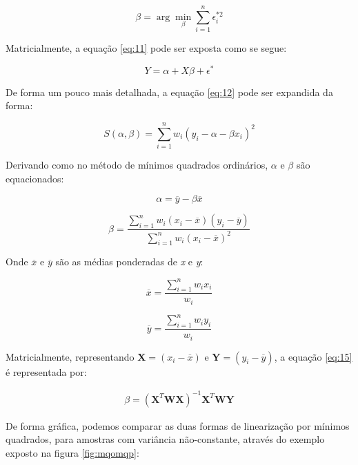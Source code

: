 \begin{equation}\label{eq:12}
 \beta =\arg\min_{\beta}\sum_{i=1}^{n}\epsilon_{i}^{*2}
\end{equation}

Matricialmente, a equação \ref{eq:11} pode ser exposta como se segue:

\begin{equation}\label{eq:11matrix}
Y = \alpha + X\beta +\epsilon^\ast
\end{equation}

De forma um pouco mais detalhada, a equação \ref{eq:12} pode ser expandida da forma:

\begin{equation}\label{eq:13}
 S(\alpha,\beta) =\sum_{i=1}^{n} w_i(y_i - \alpha - \beta x_i)^2 
\end{equation}

Derivando como no método de mínimos quadrados ordinários, $\alpha$ e $\beta$ são equacionados:

\begin{equation}\label{eq:14}
 \alpha = \overline{y} - \beta \overline{x} 
\end{equation}

\begin{equation}\label{eq:15}
  \beta =\frac{\sum_{i=1}^{n}w_i(x_i - \overline{x})(y_i - \overline{y})}{\sum_{i=1}^{n} w_i(x_i - \overline{x})^2} 
\end{equation}

Onde $\overline{x}$ e $\overline{y}$ são as médias ponderadas de \textit{x} e \textit{y}:

\begin{equation*}
  \overline{x} =\frac{\sum_{i=1}^{n}w_i x_i}{w_i} 
\end{equation*}

\begin{equation*}
  \overline{y} =\frac{\sum_{i=1}^{n}w_i y_i}{w_i} 
\end{equation*}

Matricialmente, representando $\textbf{X} = (x_i - \overline{x})$ e $\textbf{Y} = (y_i - \overline{y})$, a equação \ref{eq:15} é representada por:

\begin{align*} \beta =(\textbf{X}^{T}\textbf{W}\textbf{X})^{-1}\textbf{X}^{T}\textbf{W}\textbf{Y} \end{align*}

De forma gráfica, podemos comparar as duas formas de linearização por mínimos quadrados, para amostras com variância não-constante, através do exemplo exposto na figura \ref{fig:mqomqp}:

